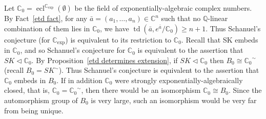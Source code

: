 \documentclass[12pt]{amsart}
\theoremstyle{definition}
\begin{document}
Let ${\ensuremath{\mathbb{C}}}_0 = \operatorname{ecl}^{\ensuremath{\mathbb{C}_{\mathrm{exp}}}}(\emptyset)$ be the field of exponentially-algebraic complex numbers. By Fact~\ref{etd fact}, for any ${{\ensuremath{\bar{a}}}} = (a_1,\ldots,a_n) \in {\ensuremath{\mathbb{C}}}^n$ such that no ${\ensuremath{\mathbb{Q}}}$-linear combination of them lies in ${\ensuremath{\mathbb{C}}}_0$, we have $\operatorname{td}({{\ensuremath{\bar{a}}}},e^{{\ensuremath{\bar{a}}}}/{\ensuremath{\mathbb{C}}}_0) {\ensuremath{\geqslant}} n+1$. Thus Schanuel's conjecture (for {\ensuremath{\mathbb{C}_{\mathrm{exp}}}}) is equivalent to its restriction to ${\ensuremath{\mathbb{C}}}_0$. Recall that SK embeds in ${\ensuremath{\mathbb{C}}}_0$, and so Schanuel's conjecture for ${\ensuremath{\mathbb{C}}}_0$ is equivalent to the assertion that $SK {\ensuremath{\lhd}} {\ensuremath{\mathbb{C}}}_0$. By Proposition~\ref{etd determines extension}, if $SK {\ensuremath{\lhd}} {\ensuremath{\mathbb{C}}}_0$ then $B_0 {\cong} {\ensuremath{{{{\ensuremath{\mathbb{C}}}_0}}^\sim}}$ (recall $B_0 = {\ensuremath{{{SK}}^\sim}}$). Thus Schanuel's conjecture is equivalent to the assertion that ${\ensuremath{\mathbb{C}}}_0$ embeds in $B_0$. If in addition ${\ensuremath{\mathbb{C}}}_0$ were {strongly exponentially-algebraically closed}, that is, ${\ensuremath{\mathbb{C}}}_0 = {\ensuremath{{{{\ensuremath{\mathbb{C}}}_0}}^\sim}}$, then there would be an isomorphism ${\ensuremath{\mathbb{C}}}_0 {\cong} B_0$. Since the automorphism group of $B_0$ is very large, such an isomorphism would be very far from being unique.
\end{document}
